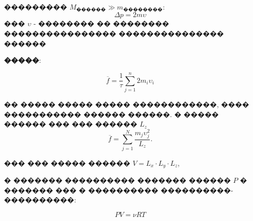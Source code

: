 ��������� $M_\text{������} \gg m_\text{��������}$:
\[\Delta p = 2m\upsilon \]��� $\upsilon$ - �������� �� �������� ���������������� ��������������� ������

\textbf{�����}:

\begin{equation}
    \overline{f} = \dfrac{1}{\tau} \sum_{j=1}^n 2 m_i \upsilon_i
\end{equation}

�� ����� ����� ����� ������������, ���� ����������� ������ ������. � ����� ������ ��� ��� ������ $L_z$
\[\overline{f} = \sum_{j = 1}^N \dfrac{m_j \upsilon_j^2}{L_z}.\]

��� ��� ����� ������ $V = L_x \cdot L_y \cdot L_z$,

\begin{center}
\end{center}

\indent � ������� ���������� ������� ������ $P$ � ������� ��� � ���������� ����������-����������:

\[PV = \nu R T \]

